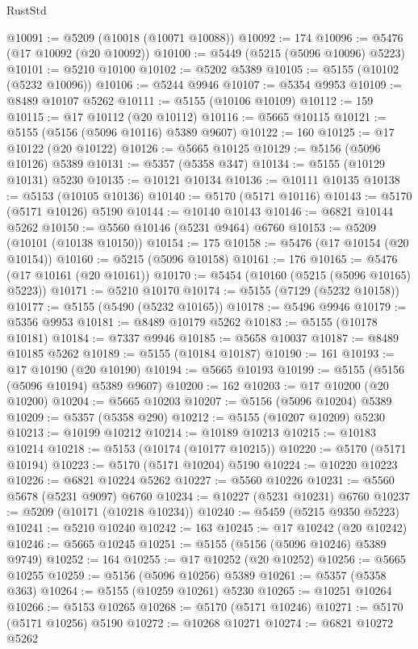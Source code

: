 \begin{lexlean}{RustStd}
\begin{coremodule}
@10091 := @5209 (@10018 (@10071 @10088))
@10092 := 174
@10096 := @5476 (@17 @10092 (@20 @10092))
@10100 := @5449 (@5215 (@5096 @10096) @5223)
@10101 := @5210 @10100
@10102 := @5202 @5389
@10105 := @5155 (@10102 (@5232 @10096))
@10106 := @5244 @9946
@10107 := @5354 @9953
@10109 := @8489 @10107 @5262
@10111 := @5155 (@10106 @10109)
@10112 := 159
@10115 := @17 @10112 (@20 @10112)
@10116 := @5665 @10115
@10121 := @5155 (@5156 (@5096 @10116) @5389 @9607)
@10122 := 160
@10125 := @17 @10122 (@20 @10122)
@10126 := @5665 @10125
@10129 := @5156 (@5096 @10126) @5389
@10131 := @5357 (@5358 @347)
@10134 := @5155 (@10129 @10131) @5230
@10135 := @10121 @10134
@10136 := @10111 @10135
@10138 := @5153 (@10105 @10136)
@10140 := @5170 (@5171 @10116)
@10143 := @5170 (@5171 @10126) @5190
@10144 := @10140 @10143
@10146 := @6821 @10144 @5262
@10150 := @5560 @10146 (@5231 @9464) @6760
@10153 := @5209 (@10101 (@10138 @10150))
@10154 := 175
@10158 := @5476 (@17 @10154 (@20 @10154))
@10160 := @5215 (@5096 @10158)
@10161 := 176
@10165 := @5476 (@17 @10161 (@20 @10161))
@10170 := @5454 (@10160 (@5215 (@5096 @10165) @5223))
@10171 := @5210 @10170
@10174 := @5155 (@7129 (@5232 @10158))
@10177 := @5155 (@5490 (@5232 @10165))
@10178 := @5496 @9946
@10179 := @5356 @9953
@10181 := @8489 @10179 @5262
@10183 := @5155 (@10178 @10181)
@10184 := @7337 @9946
@10185 := @5658 @10037
@10187 := @8489 @10185 @5262
@10189 := @5155 (@10184 @10187)
@10190 := 161
@10193 := @17 @10190 (@20 @10190)
@10194 := @5665 @10193
@10199 := @5155 (@5156 (@5096 @10194) @5389 @9607)
@10200 := 162
@10203 := @17 @10200 (@20 @10200)
@10204 := @5665 @10203
@10207 := @5156 (@5096 @10204) @5389
@10209 := @5357 (@5358 @290)
@10212 := @5155 (@10207 @10209) @5230
@10213 := @10199 @10212
@10214 := @10189 @10213
@10215 := @10183 @10214
@10218 := @5153 (@10174 (@10177 @10215))
@10220 := @5170 (@5171 @10194)
@10223 := @5170 (@5171 @10204) @5190
@10224 := @10220 @10223
@10226 := @6821 @10224 @5262
@10227 := @5560 @10226
@10231 := @5560 @5678 (@5231 @9097) @6760
@10234 := @10227 (@5231 @10231) @6760
@10237 := @5209 (@10171 (@10218 @10234))
@10240 := @5459 (@5215 @9350 @5223)
@10241 := @5210 @10240
@10242 := 163
@10245 := @17 @10242 (@20 @10242)
@10246 := @5665 @10245
@10251 := @5155 (@5156 (@5096 @10246) @5389 @9749)
@10252 := 164
@10255 := @17 @10252 (@20 @10252)
@10256 := @5665 @10255
@10259 := @5156 (@5096 @10256) @5389
@10261 := @5357 (@5358 @363)
@10264 := @5155 (@10259 @10261) @5230
@10265 := @10251 @10264
@10266 := @5153 @10265
@10268 := @5170 (@5171 @10246)
@10271 := @5170 (@5171 @10256) @5190
@10272 := @10268 @10271
@10274 := @6821 @10272 @5262

\end{coremodule}
\end{lexlean}

